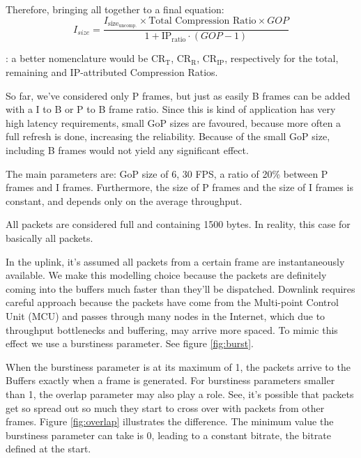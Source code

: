 \begin{itemize}
    Therefore, bringing all together to a final equation:
    \begin{equation}
        I_{size} = \frac{I_{{\text{size}}_\text{uncomp.}} \times \text{Total Compression Ratio} \times GOP}{1 + \text{IP}_\text{ratio} \cdot (GOP - 1)}
    \end{equation}

    : a better nomenclature would be $\text{CR}_\text{T}$, $\text{CR}_\text{R}$, $\text{CR}_\text{IP}$, respectively for the total, remaining and IP-attributed Compression Ratios.

\end{itemize}



So far, we've considered only P frames, but just as easily B frames can be added with a I to B or P to B frame ratio. Since this is kind of application has very high latency requirements, small GoP sizes are favoured, because more often a full refresh is done, increasing the reliability. Because of the small GoP size, including B frames would not yield any significant effect. 

The main parameters are: \acs{GoP} size of 6, 30 \acs{FPS}, a ratio of 20\% between P frames and I frames. Furthermore, the size of P frames and the size of I frames is constant, and depends only on the average throughput.

All packets are considered full and containing 1500 bytes. In reality, this case for basically all packets.

In the uplink, it's assumed all packets from a certain frame are instantaneously available. We make this modelling choice because the packets are definitely coming into the buffers much faster than they'll be dispatched. Downlink requires careful approach because the packets have come from the Multi-point Control Unit (MCU) and passes through many nodes in the Internet, which due to throughput bottlenecks and buffering, may arrive more spaced. To mimic this effect we use a burstiness parameter. See figure \ref{fig:burst}.



When the burstiness parameter is at its maximum of 1, the packets arrive to the Buffers exactly when a frame is generated. For burstiness parameters smaller than 1, the overlap parameter may also play a role. See, it's possible that packets get so spread out so much they start to cross over with packets from other frames. Figure \ref{fig:overlap} illustrates the difference. The minimum value the burstiness parameter can take is 0, leading to a constant bitrate, the bitrate defined at the start.


